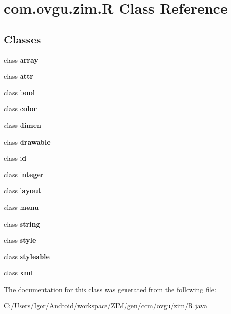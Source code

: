 \hypertarget{classcom_1_1ovgu_1_1zim_1_1_r}{\section{com.\-ovgu.\-zim.\-R Class Reference}
\label{classcom_1_1ovgu_1_1zim_1_1_r}
}
\subsection*{Classes}
\begin{DoxyCompactItemize}
\item 
class {\bfseries array}
\item 
class {\bfseries attr}
\item 
class {\bfseries bool}
\item 
class {\bfseries color}
\item 
class {\bfseries dimen}
\item 
class {\bfseries drawable}
\item 
class {\bfseries id}
\item 
class {\bfseries integer}
\item 
class {\bfseries layout}
\item 
class {\bfseries menu}
\item 
class {\bfseries string}
\item 
class {\bfseries style}
\item 
class {\bfseries styleable}
\item 
class {\bfseries xml}
\end{DoxyCompactItemize}


The documentation for this class was generated from the following file\-:\begin{DoxyCompactItemize}
\item 
C\-:/\-Users/\-Igor/\-Android/workspace/\-Z\-I\-M/gen/com/ovgu/zim/R.\-java\end{DoxyCompactItemize}
